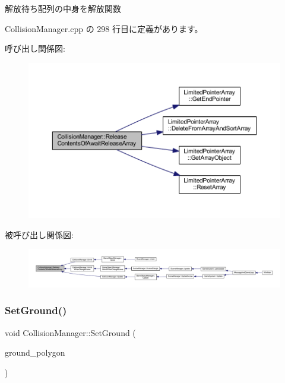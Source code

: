 解放待ち配列の中身を解放関数 



 Collision\+Manager.\+cpp の 298 行目に定義があります。

呼び出し関係図\+:
\nopagebreak
\begin{figure}[H]
\begin{center}
\leavevmode
\includegraphics[width=350pt]{class_collision_manager_a351353ddde07f2ff4f6642c8e1fc4ede_cgraph}
\end{center}
\end{figure}
被呼び出し関係図\+:
\nopagebreak
\begin{figure}[H]
\begin{center}
\leavevmode
\includegraphics[width=350pt]{class_collision_manager_a351353ddde07f2ff4f6642c8e1fc4ede_icgraph}
\end{center}
\end{figure}
\mbox{\label{class_collision_manager_a63ce6003d8d042085d7b388a4cfa0666}} 
\subsubsection{\texorpdfstring{Set\+Ground()}{SetGround()}}
{\footnotesize\ttfamily void Collision\+Manager\+::\+Set\+Ground (\begin{DoxyParamCaption}\item[{\mbox{\hyperlink{class_mesh_plane_polygon}{Mesh\+Plane\+Polygon}} $\ast$}]{ground\+\_\+polygon }\end{DoxyParamCaption})}



